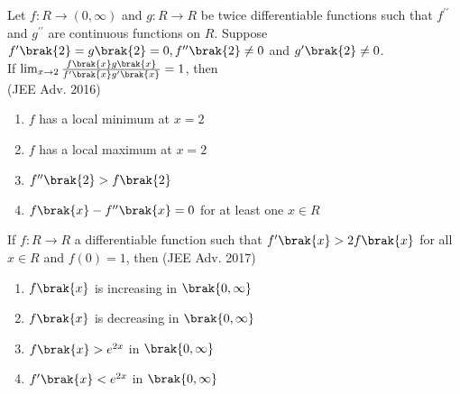     \item{
        
            Let $f: R\rightarrow (0,\infty)$ and $g: R\rightarrow R$ be twice differentiable functions such that $f^{\prime\prime}$ and $g^{\prime\prime}$ are continuous functions on $R$. Suppose $f^{\prime}\brak{2} = g\brak{2}=0, f^{\prime\prime}\brak{2} \neq0$ and $g^{\prime}\brak{2}\neq0$.\\[6pt] If $\lim_{x\to2}  \frac{f\brak{x}g\brak{x}}{f^{\prime}\brak{x}g^{\prime}\brak{x}} = 1$, then \\
             \text{  }\hfill
                {(JEE Adv. 2016)}
            \begin{multicols}{2}
                \begin{enumerate}
                    \item $f$ has a local minimum at $x=2$
                    \item $f$ has a local maximum at $x=2$
                    \item $f^{\prime\prime}\brak{2}>f\brak{2}$
                    \item $f\brak{x} - f^{\prime\prime}\brak{x} = 0$ for at least one $x\in R$
                \end{enumerate}
            \end{multicols}
        
        }
    \item{
        
            If $f: R\rightarrow R$ a differentiable function such that $f^{\prime}\brak{x}>2f\brak{x}$ for all $x \in R$ and $f(0) = 1$, then
             \text{   }\hfill
                {(JEE Adv. 2017)}
            \begin{multicols}{2}
                \begin{enumerate}
                    \item $f\brak{x}$ is increasing in $\brak{0,\infty}$
                    \item $f\brak{x}$ is decreasing in $\brak{0,\infty}$
                    \item $f\brak{x}>e^{2x}$ in $\brak{0,\infty}$
                    \item $f^{\prime}\brak{x}<e^{2x}$ in $\brak{0,\infty}$
                \end{enumerate}
            \end{multicols}
        
        }
